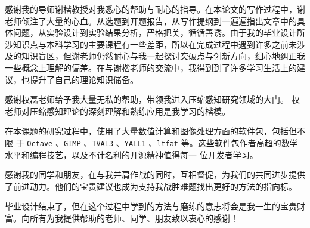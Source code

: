 \begin{thanksfor}

感谢我的导师谢楷教授对我悉心的帮助与耐心的指导。在本论文的写作过程中，谢老师倾注了大量的心血。从选题到开题报告，从写作提纲到一遍遍指出文章中的具体问题，从实验设计到实验结果分析，严格把关，循循善诱。由于我的毕业设计所涉知识点与本科学习的主要课程有一些差距，所以在完成过程中遇到许多之前未涉及的知识盲区，但谢老师仍然耐心与我一起探讨突破点与创新方向，细心地纠正我一些概念上理解的偏差。在与谢楷老师的交流中，我得到到了许多学习生活上的建议，也提升了自己的理论知识储备。

感谢权磊老师给予我大量无私的帮助，带领我进入压缩感知研究领域的大门。
权老师对压缩感知理论的深刻理解和熟练应用是我学习的楷模。

在本课题的研究过程中，使用了大量数值计算和图像处理方面的软件包，包括但不限
于 \verb|Octave| 、\verb|GIMP| 、\verb|TVAL3| 、\verb|YALL1| 、\verb|ltfat|
等。这些软件包作者高超的数学水平和编程技艺，以及不计名利的开源精神值得每一
位开发者学习。

感谢我的同学和朋友，在与我并肩作战的同时，互相督促，为我们的共同进步提供了前进动力。他们的宝贵建议也成为支持我战胜难题找出更好的方法的指向标。

毕业设计结束了，但在这个过程中学到的方法与磨练的意志将会是我一生的宝贵财富。向所有为我提供帮助的老师、同学、朋友致以衷心的感谢！

\end{thanksfor}
